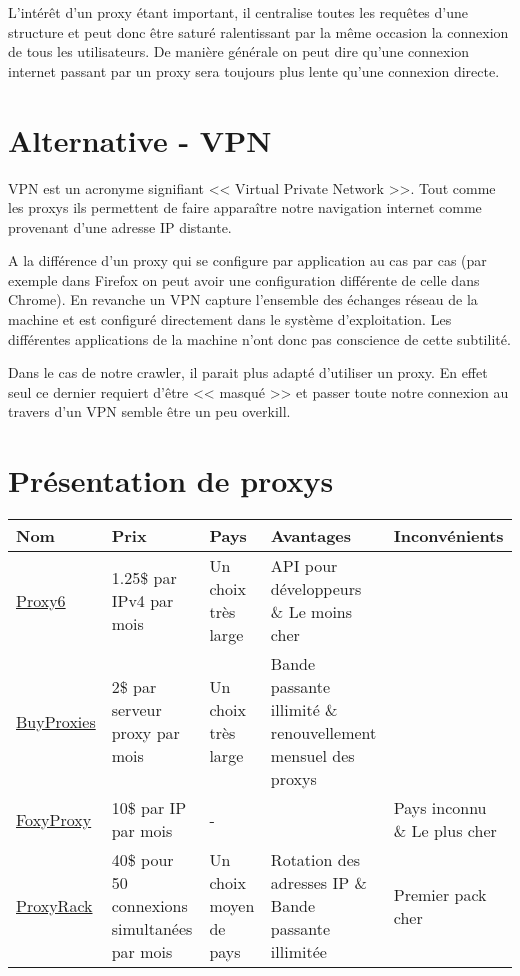 \documentclass[hideweeklyreports,noposter]{polytech/polytech}
\begin{document}
				L'intérêt d'un proxy étant important, il centralise toutes les requêtes d'une structure et peut donc être saturé ralentissant par la même occasion la connexion de tous les utilisateurs.
				De manière générale on peut dire qu'une connexion internet passant par un proxy sera toujours plus lente qu'une connexion directe.
				
		\section{Alternative - VPN}
			VPN est un acronyme signifiant << Virtual Private Network >>.
			Tout comme les proxys ils permettent de faire apparaître notre navigation internet comme provenant d'une adresse IP distante.
			
			A la différence d'un proxy qui se configure par application au cas par cas (par exemple dans Firefox on peut avoir une configuration différente de celle dans Chrome).
			En revanche un VPN capture l'ensemble des échanges réseau de la machine et est configuré directement dans le système d'exploitation.
			Les différentes applications de la machine n'ont donc pas conscience de cette subtilité.
			
			
			Dans le cas de notre crawler, il parait plus adapté d'utiliser un proxy.
			En effet seul ce dernier requiert d'être << masqué >> et passer toute notre connexion au travers d'un VPN semble être un peu overkill.
			
		\section{Présentation de proxys}
			\begin{center}
				\centering
				\begin{tabularx}{\textwidth}{|X|X|X|X|X|}
					\hline
					Nom & Prix & Pays & Avantages & Inconvénients\\\hline
					\href{https://proxy6.net/}{Proxy6} & 1.25\$ par IPv4 par mois & Un choix très large & API pour développeurs \& Le moins cher & \\\hline
					\href{https://buyproxies.org/}{BuyProxies} & 2\$ par serveur proxy par mois & Un choix très large & Bande passante illimité \& renouvellement mensuel des proxys & \\\hline
					\href{https://getfoxyproxy.org/}{FoxyProxy} & 10\$ par IP par mois & - & & Pays inconnu \& Le plus cher\\\hline
					\href{https://proxyrack.com/}{ProxyRack} & 40\$ pour 50 connexions simultanées par mois & Un choix moyen de pays & Rotation des adresses IP \& Bande passante illimitée & Premier pack cher\\\hline
				\end{tabularx}
			\end{center}
		
\end{document}
